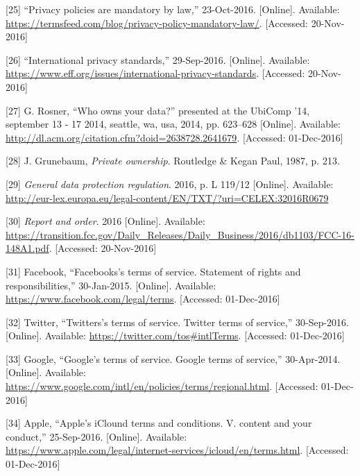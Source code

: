 \documentclass[12pt,english,a4paper,titlepage,cleardoublepage=empty,dottedtoc]{report}
\begin{document}
\hypertarget{ref-web_2016_privacy-policies-are-mandatory-by-law}{}
{[}25{]} ``Privacy policies are mandatory by law,'' 23-Oct-2016.
{[}Online{]}. Available:
\url{https://termsfeed.com/blog/privacy-policy-mandatory-law/}.
{[}Accessed: 20-Nov-2016{]}

\hypertarget{ref-web_2016_international-privacy-standards}{}
{[}26{]} ``International privacy standards,'' 29-Sep-2016. {[}Online{]}.
Available:
\url{https://www.eff.org/issues/international-privacy-standards}.
{[}Accessed: 20-Nov-2016{]}

\hypertarget{ref-paper_2014_who-owns-yours-data}{}
{[}27{]} G. Rosner, ``Who owns your data?'' presented at the UbiComp
'14, september 13 - 17 2014, seattle, wa, usa, 2014, pp. 623--628
{[}Online{]}. Available:
\url{http://dl.acm.org/citation.cfm?doid=2638728.2641679}. {[}Accessed:
01-Dec-2016{]}

\hypertarget{ref-book_1987_private-ownership_definition}{}
{[}28{]} J. Grunebaum, \emph{Private ownership}. Routledge \& Kegan
Paul, 1987, p. 213.

\hypertarget{ref-regulation_2016_eu_general-data-protection-regulation_ownership}{}
{[}29{]} \emph{General data protection regulation}. 2016, p. L 119/12
{[}Online{]}. Available:
\url{http://eur-lex.europa.eu/legal-content/EN/TXT/?uri=CELEX:32016R0679}

\hypertarget{ref-rules_2016_fcc_to-protect-broadband-consumer-privacy_ownership}{}
{[}30{]} \emph{Report and order}. 2016 {[}Online{]}. Available:
\url{https://transition.fcc.gov/Daily_Releases/Daily_Business/2016/db1103/FCC-16-148A1.pdf}.
{[}Accessed: 20-Nov-2016{]}

\hypertarget{ref-web_2016_facebook_terms-of-service}{}
{[}31{]} Facebook, ``Facebooks's terms of service. Statement of rights
and responsibilities,'' 30-Jan-2015. {[}Online{]}. Available:
\url{https://www.facebook.com/legal/terms}. {[}Accessed: 01-Dec-2016{]}

\hypertarget{ref-web_2016_twitter_terms-of-service}{}
{[}32{]} Twitter, ``Twitters's terms of service. Twitter terms of
service,'' 30-Sep-2016. {[}Online{]}. Available:
\url{https://twitter.com/tos\#intlTerms}. {[}Accessed: 01-Dec-2016{]}

\hypertarget{ref-web_2016_google_terms-of-service}{}
{[}33{]} Google, ``Google's terms of service. Google terms of service,''
30-Apr-2014. {[}Online{]}. Available:
\url{https://www.google.com/intl/en/policies/terms/regional.html}.
{[}Accessed: 01-Dec-2016{]}

\hypertarget{ref-web_2016_apple-icloud_terms-of-service}{}
{[}34{]} Apple, ``Apple's iClound terms and conditions. V. content and
your conduct,'' 25-Sep-2016. {[}Online{]}. Available:
\url{https://www.apple.com/legal/internet-services/icloud/en/terms.html}.
{[}Accessed: 01-Dec-2016{]}
\end{document}
